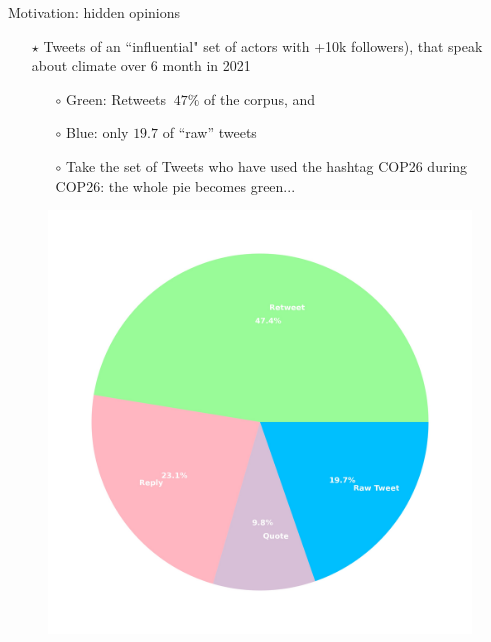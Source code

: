 \documentclass[xcolor=table,handout]{beamer}
\begin{document}
\begin{frame}{Motivation: hidden opinions}
\vspace{3mm}
\begin{itemize}
\item[$\star$] Tweets of an ``influential" set of actors with +10k followers), that speak about climate over 6 month in 2021 \smallskip

	\begin{itemize}\setlength\itemsep{1em}
		\item[$\circ$] Green: Retweets $~47\%$ of the corpus, and 
		\item[$\circ$] Blue: only $19.7$ of ``raw'' tweets
		\item[$\circ$] Take the set of Tweets who have used the hashtag COP26 during COP26: the whole pie becomes green...  
	\end{itemize} 
\end{itemize}
\begin{figure}
\centering
  \includegraphics[scale = 0.06]{./img/pie_tweets_all.jpg}
\end{figure}
\end{frame}
\end{document}
